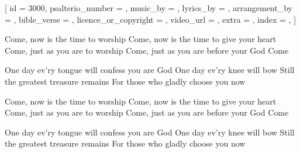 
[
    id = {3000},
    psalterio_number = {},
    music_by = {},
    lyrics_by = {},
    arrangement_by = {},
    bible_verse = {},
    licence_or_copyright = {},
    video_url = {},
    extra = {},
    index = {},
]


\beginverse

Come, now is the time to worship
Come, now is the time to give your heart
Come, just as you are to worship
Come, just as you are before your God
Come

\endverse


\beginchorus

One day ev'ry tongue will confess you are God
One day ev'ry knee will bow
Still the greatest treasure remains
For those who gladly choose you now

\endchorus


\beginverse

Come, now is the time to worship
Come, now is the time to give your heart
Come, just as you are to worship
Come, just as you are before your God
Come

\endverse


\beginchorus

One day ev'ry tongue will confess you are God
One day ev'ry knee will bow
Still the greatest treasure remains
For those who gladly choose you now

\endchorus





\endsong
